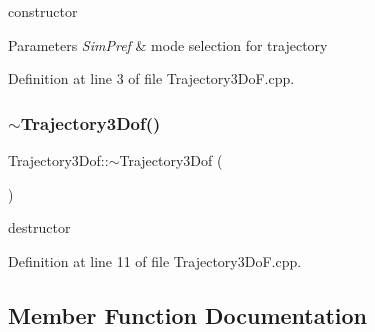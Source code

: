 constructor 


\begin{DoxyParams}{Parameters}
{\em Sim\+Pref} & mode selection for trajectory \\
\hline
\end{DoxyParams}


Definition at line 3 of file Trajectory3\+Do\+F.\+cpp.

\mbox{\label{class_trajectory3_dof_ab7f3c2605332be2030b923e07112e9c2}} 
\subsubsection{\texorpdfstring{$\sim$\+Trajectory3\+Dof()}{~Trajectory3Dof()}}
{\footnotesize\ttfamily Trajectory3\+Dof\+::$\sim$\+Trajectory3\+Dof (\begin{DoxyParamCaption}{ }\end{DoxyParamCaption})}



destructor 



Definition at line 11 of file Trajectory3\+Do\+F.\+cpp.



\subsection{Member Function Documentation}
\mbox{\label{class_trajectory3_dof_ab132d729efaded8c7942d462d69cba62}} 
